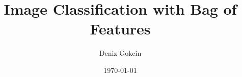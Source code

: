 \newcommand{\mytitle}{Image Classification with Bag of Features}
\newcommand{\myauthor}{Deniz Gokcin}

\title{\mytitle}
\author{\myauthor}
\date{\today}
